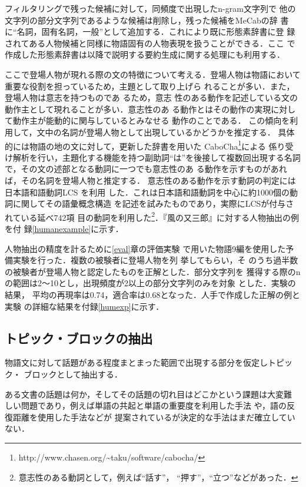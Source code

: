 \documentclass[japanese]{jnlp_1.4}
\begin{document}
  フィルタリングで残った候補に対して，同頻度で出現したn-gram文字列で
  他の文字列の部分文字列であるような候補は削除し，残った候補をMeCabの辞
  書に``名詞，固有名詞，一般''として追加する．これにより既に形態素辞書に登
  録されてある人物候補と同様に物語固有の人物表現を扱うことができる．ここ
  で作成した形態素辞書は以降で説明する要約生成に関する処理にも利用する．

  ここで登場人物が現れる際の文の特徴について考える．登場人物は物語において重要な役割を担っているため，主題として取り上げら
  れることが多い\cite{danwabunseki}．また，登場人物は意志を持つものであ
  るため，意志
  性のある動作を記述している文の動作主として現れることが多い．意志性のあ
  る動作とはその動作の実現に対して動作主が能動的に関与しているとみなせる
  動作のことである．
  この傾向を利用して，文中の名詞が登場人物として出現しているかどうかを推定する．
  具体的には物語の地の文に対して，更新した辞書を用いた
  CaboCha\footnote{http://www.chasen.org/\~{}taku/software/cabocha/}による
  係り受け解析を行い，主題化する機能を持つ副助詞``は''を後接して複数回出現する名詞で，その文の述部となる動詞に一つでも意志性のあ
  る動作を示すものがあれば，その名詞を登場人物と推定する．
  意志性のある動作を示す動詞の判定には日本語和語動詞LCS \cite{ecs}を利用
  した．これは日本語和語動詞を中心に約1000個の動詞に関してその語彙概念構造
  を記述を試みたものであり，実際にLCSが付与されている延べ742項
  目の動詞を利用した\footnote{意志性のある動詞として，例えば``話す''，
  ``押す''，``立つ''などがあった．}．『風の又三郎』に対する人物抽出の例を付
  録\ref{humanexample}に示す．

  人物抽出の精度を計るために\ref{eval}章の評価実験
  で用いた物語9編を使用した予備実験を行った．複数の被験者に登場人物を列
  挙してもらい，そ
  のうち過半数の被験者が登場人物と認定したものを正解とした．部分文字列を
  獲得する際のnの範囲は2〜10とし，出現頻度が2以上の部分文字列のみを対象
  とした．実験の結果，
  平均の再現率は0.74，適合率は0.68となった．人手で作成した正解の例と実験
  の詳細な結果を付録\ref{humexp}に示す．

  \subsection{トピック・ブロックの抽出}\label{topic}

  物語文に対して話題がある程度まとまった範囲で出現する部分を仮定しトピック・
  ブロックとして抽出する．

  ある文書の話題は何か，そしてその話題の切れ目はどこかという課題は大変難
  しい問題であり，例えば単語の共起と単語の重要度を利用した手法
  \cite{hirao2000}や，語の反復距離を使用した手法\cite{nakano2006}などが
  提案されているが決定的な手法はまだ確立していない．
\end{document}
